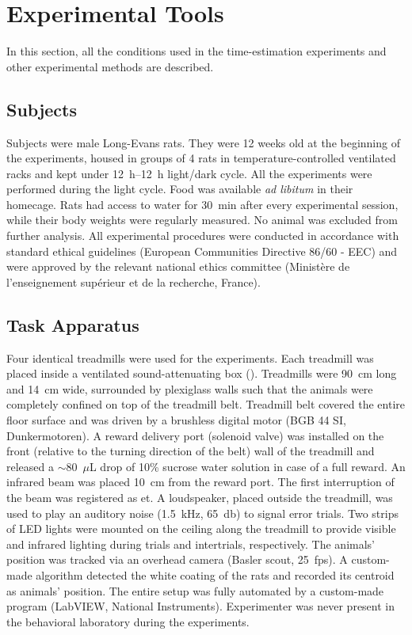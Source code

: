 \section{Experimental Tools} \label{ch:methods:exp}
In this section, all the conditions used in the time-estimation experiments and other experimental methods are described.

\subsection{Subjects}
Subjects were male Long-Evans rats.
They were 12 weeks old at the beginning of the experiments, housed in groups of 4 rats in temperature-controlled ventilated racks and kept under 12~h--12~h light/dark cycle.
All the experiments were performed during the light cycle.
Food was available \textit{ad libitum} in their homecage.
Rats had access to water for 30~min after every experimental session, while their body weights were regularly measured.
No animal was excluded from further analysis.
All experimental procedures were conducted in accordance with standard ethical guidelines (European Communities Directive 86/60 - EEC) and were approved by the relevant national ethics committee (Minist\`{e}re de l'enseignement sup\'{e}rieur et de la recherche, France).

\subsection{Task Apparatus}
Four identical treadmills were used for the experiments.
Each treadmill was placed inside a ventilated sound-attenuating box ().
Treadmills were 90~cm long and 14~cm wide, surrounded by plexiglass walls such that the animals were completely confined on top of the treadmill belt.
Treadmill belt covered the entire floor surface and was driven by a brushless digital motor (BGB 44 SI, Dunkermotoren).
A reward delivery port (solenoid valve) was installed on the front (relative to the turning direction of the belt) wall of the treadmill and released a $\sim$80~$\mu$L drop of 10\% sucrose water solution in case of a full reward.
An infrared beam was placed 10~cm from the reward port.
The first interruption of the beam was registered as \gls{et}.
A loudspeaker, placed outside the treadmill, was used to play an auditory noise (1.5~kHz, 65~db) to signal error trials.
Two strips of LED lights were mounted on the ceiling along the treadmill to provide visible and infrared lighting during trials and intertrials, respectively.
The animals' position was tracked via an overhead camera (Basler scout, 25~fps).
A custom-made algorithm detected the white coating of the rats and recorded its centroid as animals' position.
The entire setup was fully automated by a custom-made program (LabVIEW, National Instruments).
Experimenter was never present in the behavioral laboratory during the experiments.


